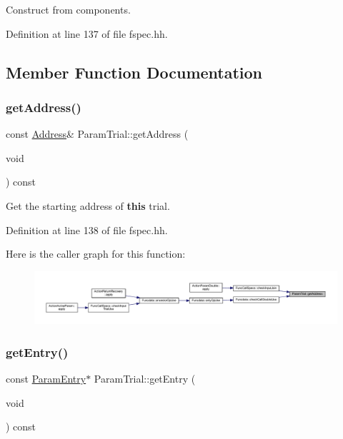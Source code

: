 Construct from components. 



Definition at line 137 of file fspec.\+hh.



\subsection{Member Function Documentation}
\mbox{\label{class_param_trial_aad40b54a44a9eae8890e6d6ebbb6d5bb}} 
\subsubsection{\texorpdfstring{getAddress()}{getAddress()}}
{\footnotesize\ttfamily const \mbox{\hyperlink{class_address}{Address}}\& Param\+Trial\+::get\+Address (\begin{DoxyParamCaption}\item[{void}]{ }\end{DoxyParamCaption}) const\hspace{0.3cm}{\ttfamily [inline]}}



Get the starting address of {\bfseries{this}} trial. 



Definition at line 138 of file fspec.\+hh.

Here is the caller graph for this function\+:
\nopagebreak
\begin{figure}[H]
\begin{center}
\leavevmode
\includegraphics[width=350pt]{class_param_trial_aad40b54a44a9eae8890e6d6ebbb6d5bb_icgraph}
\end{center}
\end{figure}
\mbox{\label{class_param_trial_aa4c4b22cd813b218292b6bc7db4e00e1}} 
\subsubsection{\texorpdfstring{getEntry()}{getEntry()}}
{\footnotesize\ttfamily const \mbox{\hyperlink{class_param_entry}{Param\+Entry}}$\ast$ Param\+Trial\+::get\+Entry (\begin{DoxyParamCaption}\item[{void}]{ }\end{DoxyParamCaption}) const\hspace{0.3cm}{\ttfamily [inline]}}



